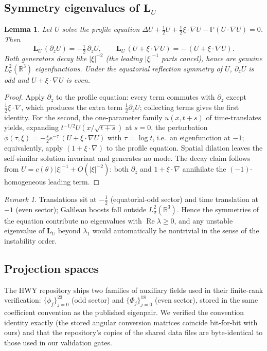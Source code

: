\documentclass[11pt]{article}
\newcommand{\R}{\mathbb{R}}
\newcommand{\Lsig}{L^2_\sigma(\R^3)}
\newcommand{\LU}{\mathbf{L}_{U}}
\theoremstyle{plain}
\newtheorem{lemma}{Lemma}
\theoremstyle{remark}
\newtheorem{remark}{Remark}
\begin{document}
\subsection{Symmetry eigenvalues of $\LU$}\label{sec:symm}
\begin{lemma}\label{lem:symm}
Let $U$ solve the profile equation
$\Delta U + \tfrac12 U + \tfrac12 \xi\cdot\nabla U
- \mathbb{P}(U\cdot\nabla U) = 0$. Then
\[
\LU\,(\partial_z U) = -\tfrac12\,\partial_z U,
\qquad
\LU\,(U + \xi\cdot\nabla U) = -\,(U + \xi\cdot\nabla U).
\]
Both generators decay like $|\xi|^{-2}$ (the leading $|\xi|^{-1}$ parts
cancel), hence are genuine $\Lsig$ eigenfunctions. Under the equatorial
reflection symmetry of $U$, $\partial_z U$ is odd and
$U + \xi\cdot\nabla U$ is even.
\end{lemma}
\begin{proof}
Apply $\partial_z$ to the profile equation: every term commutes with
$\partial_z$ except $\tfrac12\xi\cdot\nabla$, which produces the extra
term $\tfrac12\partial_z U$; collecting terms gives the first identity.
For the second, the one-parameter family $u(x, t+s)$ of time-translates
yields, expanding $t^{-1/2}U(x/\sqrt{t+s})$ at $s=0$, the perturbation
$\phi(\tau,\xi) = -\tfrac{s}{2}e^{-\tau}\,(U + \xi\cdot\nabla U)$ with
$\tau = \log t$, i.e.\ an eigenfunction at $-1$; equivalently, apply
$(1 + \xi\cdot\nabla)$ to the profile equation. Spatial dilation leaves
the self-similar solution invariant and generates no mode. The decay
claim follows from $U = c(\theta)|\xi|^{-1} + O(|\xi|^{-2})$: both
$\partial_z$ and $1+\xi\cdot\nabla$ annihilate the
$(-1)$-homogeneous leading term.
\end{proof}

\begin{remark}\label{rem:nontrivial}
Translations sit at $-\tfrac12$ (equatorial-odd sector) and time
translation at $-1$ (even sector); Galilean boosts fall outside
$\Lsig$. Hence the symmetries of the equation contribute no eigenvalues
with $\operatorname{Re}\lambda \ge 0$, and any unstable eigenvalue of
$\LU$ beyond $\lambda_1$ would automatically be nontrivial in the sense
of the instability order.
\end{remark}

\subsection{Projection spaces}
The HWY repository ships two families of auxiliary fields used in their
finite-rank verification: $\{\phi_j\}_{j=0}^{23}$ (odd sector) and
$\{\Phi_j\}_{j=0}^{18}$ (even sector), stored in the same coefficient
convention as the published eigenpair. We verified the convention
identity exactly (the stored angular conversion matrices coincide
bit-for-bit with ours) and that the repository's copies of the shared
data files are byte-identical to those used in our validation gates.
\end{document}
